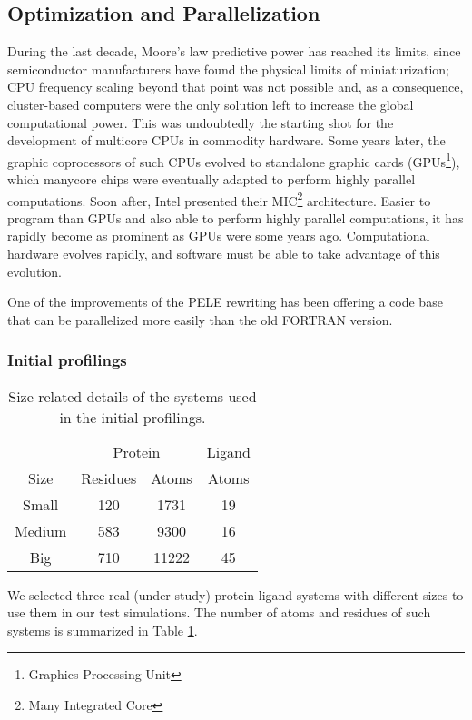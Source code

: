 \subsection{Optimization and Parallelization}

During the last decade, Moore's law predictive power has  reached its limits, since semiconductor manufacturers have found the
physical limits of miniaturization; CPU frequency scaling beyond that point was not
possible and, as a consequence, cluster-based computers were the only solution left to increase the global
computational power. This was undoubtedly the starting shot for the development of multicore CPUs in commodity
hardware. Some years later, the graphic coprocessors of such CPUs evolved to standalone graphic cards
(GPUs\footnote{Graphics Processing Unit}), which manycore chips were eventually adapted to perform highly parallel
computations. Soon after, Intel presented their MIC\footnote{Many Integrated Core} architecture. Easier to program
than GPUs and also able to perform highly parallel computations, it has rapidly become as prominent as GPUs were some years
ago. Computational hardware evolves rapidly, and software must be able to take advantage of this evolution.

One of the improvements of the PELE rewriting has been offering a code base that can be parallelized more easily than the old
FORTRAN version.

\subsubsection{Initial profilings}

\begin{table}
\centering
\begin{tabular}{ c c c c } 
\toprule
~ & \multicolumn{2}{c}{Protein}  & Ligand \\
\cline{2-4}
Size &  Residues &  Atoms &  Atoms\\
\midrule
Small & 120 & 1731 & 19\\
Medium & 583 & 9300 & 16\\
Big & 710 & 11222 & 45\\ 
\bottomrule
\end{tabular}

\caption{Size-related details of the systems used in the initial profilings.}
\label{table:profile_sizes}
\end{table}

We selected three real (under study) protein-ligand systems with different sizes to use them in our test simulations. The
number of atoms and residues of such systems is summarized in Table \ref{table:profile_sizes}. 

